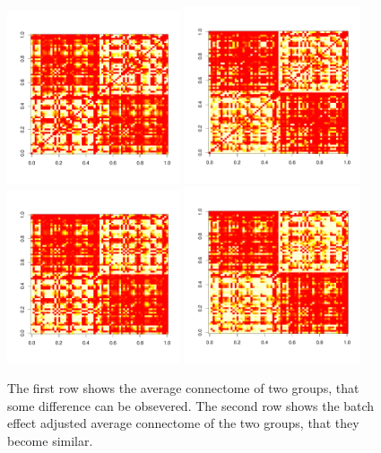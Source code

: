 \documentclass[simplex.tex]{subfiles}
\begin{document}
\begin{figure}[h!]
\begin{cframed}
\centering
\includegraphics[width=0.455\textwidth, clip = true, trim = 0 0 15mm 0]{../../figs/avgA1}
\includegraphics[width=0.4635\textwidth, clip = true, trim = 7mm 0 4mm 0]{../../figs/avgA3}
\includegraphics[width=0.455\textwidth, clip = true, trim = 0 0 15mm 0]{../../figs/avgA1adjusted}
\includegraphics[width=0.4635\textwidth, clip = true, trim = 7mm 0 4mm 0]{../../figs/avgA3adjusted}
\caption{The first row shows the average connectome of two groups, that some difference can be obsevered. The second row shows the batch effect adjusted average connectome of the two groups, that they become similar.}
\end{cframed}
\end{figure}
\end{document}
